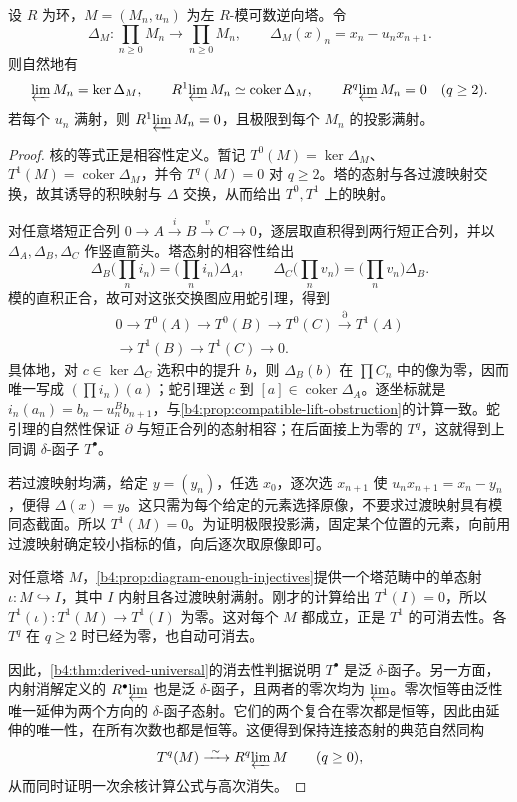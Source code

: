 \begin{theorem}\label{b4:thm:countable-derived-limit}
	设 \(R\) 为环，\(M=(M_n,u_n)\) 为左 \(R\)-模可数逆向塔。令
	\[
		\Delta_M:\prod_{n\ge0}M_n\longrightarrow\prod_{n\ge0}M_n, \qquad \Delta_M(x)_n=x_n-u_nx_{n+1}.
	\]
	则自然地有
	\[
		\varprojlim M_n=\ker\Delta_M,\qquad R^1\!\varprojlim M_n\simeq\operatorname{coker}\Delta_M, \qquad R^q\!\varprojlim M_n=0\quad(q\ge2).
	\]
	若每个 \(u_n\) 满射，则 \(R^1\!\varprojlim M_n=0\)，且极限到每个 \(M_n\) 的投影满射。
\end{theorem}
\begin{proof}
	核的等式正是相容性定义。暂记 \(T^0(M)=\ker\Delta_M\)、\(T^1(M)=\operatorname{coker}\Delta_M\)，并令 \(T^q(M)=0\) 对 \(q\ge2\)。塔的态射与各过渡映射交换，故其诱导的积映射与 \(\Delta\) 交换，从而给出 \(T^0,T^1\) 上的映射。

	对任意塔短正合列 \(0\to A\xrightarrow{i}B\xrightarrow{v}C\to0\)，逐层取直积得到两行短正合列，并以 \(\Delta_A,\Delta_B,\Delta_C\) 作竖直箭头。塔态射的相容性给出
	\[
		\Delta_B\bigl(\prod_n i_n\bigr) =\bigl(\prod_n i_n\bigr)\Delta_A, \qquad \Delta_C\bigl(\prod_n v_n\bigr) =\bigl(\prod_n v_n\bigr)\Delta_B.
	\]
	模的直积正合，故可对这张交换图应用蛇引理，得到
	\[
		\begin{gathered}
			0\longrightarrow T^0(A)\longrightarrow T^0(B)\longrightarrow T^0(C) \xrightarrow{\partial}T^1(A)\\
			\longrightarrow T^1(B)\longrightarrow T^1(C)\longrightarrow0.
		\end{gathered}
	\]
	具体地，对 \(c\in\ker\Delta_C\) 选积中的提升 \(b\)，则 \(\Delta_B(b)\) 在 \(\prod C_n\) 中的像为零，因而唯一写成 \((\prod i_n)(a)\)；蛇引理送 \(c\) 到 \([a]\in\operatorname{coker}\Delta_A\)。逐坐标就是 \(i_n(a_n)=b_n-u_n^Bb_{n+1}\)，与\cref{b4:prop:compatible-lift-obstruction}的计算一致。蛇引理的自然性保证 \(\partial\) 与短正合列的态射相容；在后面接上为零的 \(T^q\)，这就得到上同调 \(\delta\)-函子 \(T^\bullet\)。

	若过渡映射均满，给定 \(y=(y_n)\)，任选 \(x_0\)，逐次选 \(x_{n+1}\) 使 \(u_nx_{n+1}=x_n-y_n\)，便得 \(\Delta(x)=y\)。这只需为每个给定的元素选择原像，不要求过渡映射具有模同态截面。所以 \(T^1(M)=0\)。为证明极限投影满，固定某个位置的元素，向前用过渡映射确定较小指标的值，向后逐次取原像即可。

	对任意塔 \(M\)，\cref{b4:prop:diagram-enough-injectives}提供一个塔范畴中的单态射 \(\iota:M\hookrightarrow I\)，其中 \(I\) 内射且各过渡映射满射。刚才的计算给出 \(T^1(I)=0\)，所以 \(T^1(\iota):T^1(M)\to T^1(I)\) 为零。这对每个 \(M\) 都成立，正是 \(T^1\) 的可消去性。各 \(T^q\) 在 \(q\ge2\) 时已经为零，也自动可消去。

	因此，\cref{b4:thm:derived-universal}的消去性判据说明 \(T^\bullet\) 是泛 \(\delta\)-函子。另一方面，内射消解定义的 \(R^\bullet\!\varprojlim\) 也是泛 \(\delta\)-函子，且两者的零次均为 \(\varprojlim\)。零次恒等由泛性唯一延伸为两个方向的 \(\delta\)-函子态射。它们的两个复合在零次都是恒等，因此由延伸的唯一性，在所有次数也都是恒等。这便得到保持连接态射的典范自然同构
	\[
		T^q(M)\xrightarrow{\ \sim\ }R^q\!\varprojlim M \qquad(q\ge0),
	\]
	从而同时证明一次余核计算公式与高次消失。
\end{proof}

